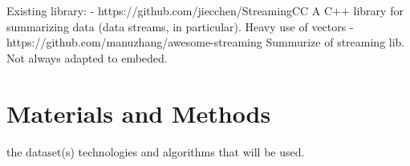 \documentclass{article}
\begin{document}
Existing library:
- https://github.com/jiecchen/StreamingCC
	A C++ library for summarizing data (data streams, in particular).
	Heavy use of vectors
- https://github.com/manuzhang/awesome-streaming
	Summurize of streaming lib. Not always adapted to embeded.
\section{Materials and Methods}
the dataset(s)
technologies and algorithms that will be used.
\end{document}
